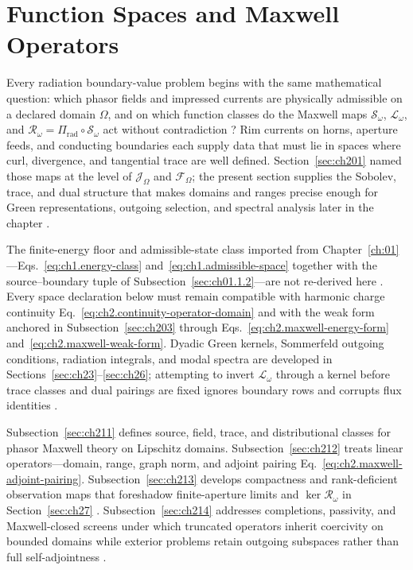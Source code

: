 \section{Function Spaces and Maxwell Operators}
\label{sec:ch21}

Every radiation boundary-value problem begins with the same mathematical question: which
phasor fields and impressed currents are physically admissible on a declared domain
\(\Omega\), and on which function classes do the Maxwell maps \(\mathcal{S}_\omega\),
\(\mathcal{L}_\omega\), and \(\mathcal{R}_\omega=\Pi_{\mathrm{rad}}\circ\mathcal{S}_\omega\)
act without contradiction \cite{stratton1941,harrington2001}? Rim currents on horns,
aperture feeds, and conducting boundaries each supply data that must lie in spaces where
curl, divergence, and tangential trace are well defined. Section~\ref{sec:ch201} named
those maps at the level of \(\mathcal{J}_\Omega\) and \(\mathcal{F}_\Omega\); the
present section supplies the Sobolev, trace, and dual structure that makes domains and
ranges precise enough for Green representations, outgoing selection, and spectral
analysis later in the chapter \cite{maxwell1873}.

The finite-energy floor and admissible-state class imported from Chapter~\ref{ch:01}---Eqs.~\eqref{eq:ch1.energy-class} and~\eqref{eq:ch1.admissible-space} together with the source--boundary tuple of Subsection~\ref{sec:ch01.1.2}---are not re-derived here \cite{stratton1941}. Every space declaration below must remain compatible with harmonic charge continuity Eq.~\eqref{eq:ch2.continuity-operator-domain} and with the weak form anchored in Subsection~\ref{sec:ch203} through Eqs.~\eqref{eq:ch2.maxwell-energy-form} and~\eqref{eq:ch2.maxwell-weak-form}. Dyadic Green kernels, Sommerfeld outgoing conditions, radiation integrals, and modal spectra are developed in Sections~\ref{sec:ch23}--\ref{sec:ch26}; attempting to invert \(\mathcal{L}_\omega\) through a kernel before trace classes and dual pairings are fixed ignores boundary rows and corrupts flux identities \cite{stratton1941}.

Subsection~\ref{sec:ch211} defines source, field, trace, and distributional classes for phasor Maxwell theory on Lipschitz domains. Subsection~\ref{sec:ch212} treats linear operators---domain, range, graph norm, and adjoint pairing Eq.~\eqref{eq:ch2.maxwell-adjoint-pairing}. Subsection~\ref{sec:ch213} develops compactness and rank-deficient observation maps that foreshadow finite-aperture limits and \(\ker\mathcal{R}_\omega\) in Section~\ref{sec:ch27} \cite{chu1948,devaney2004}. Subsection~\ref{sec:ch214} addresses completions, passivity, and Maxwell-closed screens under which truncated operators inherit coercivity on bounded domains while exterior problems retain outgoing subspaces rather than full self-adjointness \cite{harrington2001}.

